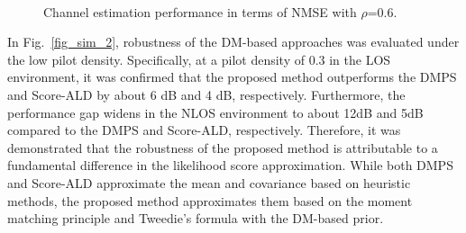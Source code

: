 \documentclass[lettersize,journal]{IEEEtran}
\begin{document}
\begin{figure}[!t]
\\
\caption{Channel estimation performance in terms of NMSE with $\rho$=0.6.}
\label{fig_sim_1}
\end{figure}

In Fig.~\ref{fig_sim_2}, robustness of the DM-based approaches was evaluated under the low pilot density. Specifically, at a pilot density of 0.3 in the LOS environment, it was confirmed that the proposed method outperforms the DMPS and Score-ALD by about 6 dB and 4 dB, respectively. Furthermore, the performance gap widens in the NLOS environment to about 12dB and 5dB compared to the DMPS and Score-ALD, respectively. Therefore, it was demonstrated that the robustness of the proposed method is attributable to a fundamental difference in the likelihood score approximation. While both DMPS and Score-ALD approximate the mean and covariance based on heuristic methods, the proposed method approximates them based on the moment matching principle and Tweedie's formula with the DM-based prior.
\end{document}

